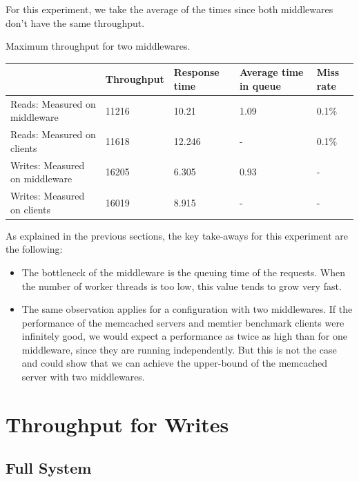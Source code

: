 \documentclass[11pt,a4paper]{article}
\begin{document}
For this experiment, we take the average of the times since both middlewares don't have the same throughput. 
\begin{center}
	{Maximum throughput for two middlewares.}
	\begin{tabular}{|l|p{2cm}|p{2cm}|p{2cm}|p{2cm}|}
		\hline                                & Throughput & Response time & Average time in queue & Miss rate \\ 
		\hline Reads: Measured on middleware  &11216            &10.21               &1.09                       &0.1\%           \\
		\hline Reads: Measured on clients     & 11618            &12.246               &-                   &0.1\%           \\ 
		\hline Writes: Measured on middleware &16205            &6.305               &0.93                       &-       \\ 
		\hline Writes: Measured on clients    &16019            &8.915               &-                   &-       \\ 
		\hline 
	\end{tabular}
\end{center}

As explained in the previous sections, the key take-aways for this experiment are the following:

\begin{itemize}
\item The bottleneck of the middleware is the queuing time of the requests. When the number of worker threads is too low, this value tends to grow very fast.  
\item The same observation applies for a configuration with two middlewares. If the performance of the memcached servers and memtier benchmark clients were infinitely good, we would expect a performance as twice as high than for one middleware, since they are running independently. But this is not the case and could show that we can achieve the upper-bound of the memcached server with two middlewares. 
\end{itemize}
\newpage

\section{Throughput for Writes}

\subsection{Full System}
\end{document}
